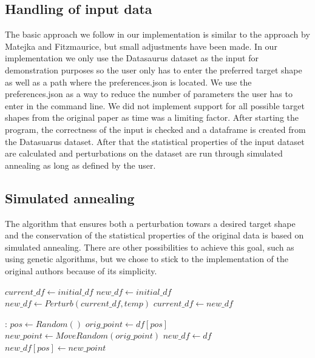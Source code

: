 \documentclass[sigconf]{acmart}
\begin{document}
\subsection{Handling of input data}
\label{sub:sec:input}
The basic approach we follow in our implementation is similar to the approach by Matejka and Fitzmaurice, but small adjustments have been made. In our implementation we only use the Datasaurus dataset as the input for demonstration
purposes so the user only has to enter the preferred target shape as well as a path where the preferences.json is located. We use the preferences.json as a way to reduce the number of parameters the user has to enter in the command line. We
did not implement support for all possible target shapes from the original paper as time was a limiting factor. After starting the program, the correctness of the input is checked and a dataframe is created from the Datasuarus dataset. After that the
statistical properties of the input dataset are calculated and perturbations on the dataset are run through simulated annealing as long as defined by the user. 

\subsection{Simulated annealing}
\label{sub:sec:annealing}
The algorithm that ensures both a perturbation towars a desired target shape and the conservation of the statistical properties of the original data is based on simulated annealing. There are other possibilities to achieve this goal, such as using genetic algorithms, but we chose to stick to the implementation of the original authors\cite{10.1145/3025453.3025912} because of its simplicity.

\begin{algorithm}[H]
\caption{}
\begin{algorithmic}[1]
	\State $current\_df\gets initial\_df$
	\State $new\_df\gets initial\_df$
		\State $new\_df\gets Perturb(current\_df,temp)$
			\State $current\_df\gets new\_df$
		\EndIf
	\EndFor
	
:
	\State $pos\gets Random()$
	\State $orig\_point\gets df[pos]$
	\Loop
		\State $new\_point\gets MoveRandom(orig\_point)$
			\State $new\_df\gets df$
			\State $new\_df[pos]\gets new\_point$
		\EndIf
	\EndLoop
\EndFunction
\end{algorithmic}
\end{algorithm}
\end{document}
